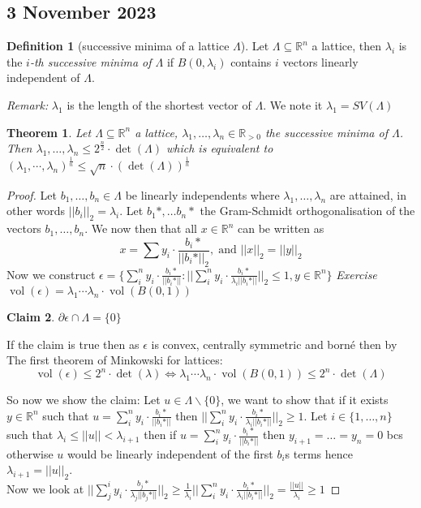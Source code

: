 \documentclass[a4paper,11pt,american]{article}
\newcommand{\R}{\mathbb{R}}
\DeclareMathOperator{\vol}{vol}
\theoremstyle{plain}
\newtheorem{theorem}{Theorem}
\newtheorem{claim}[theorem]{Claim}
\theoremstyle{definition}
\newtheorem{definition}{Definition}
\begin{document}
\subsection*{3 November 2023}

\begin{definition}[successive minima of a lattice $\Lambda$]
    Let $\Lambda\subseteq \R^n$ a lattice, then $\lambda_i$ is the \emph{$i$-th successive minima of $\Lambda
    $} if $B(0,\lambda_i)$ contains $i$ vectors linearly independent of $\Lambda$.
\end{definition}
\emph{Remark:} $\lambda_1$ is the length of the shortest vector of $\Lambda$. We note it $\lambda_1=SV(\Lambda)$
\begin{theorem}
    Let $\Lambda\subseteq \R^n$ a lattice, $\lambda_1,\dots,\lambda_n\in\R_{>0}$ the successive minima of $\Lambda$. Then $\lambda_1,\dots,\lambda_n\leq 2^\frac{n}{2}\cdot\det(\Lambda)$ which is equivalent to  $(\lambda_1,\cdots,\lambda_n)^{\frac{1}{n}}\leq \sqrt{n}\cdot(\det(\Lambda))^{\frac{1}{n}}$
\end{theorem}
\begin{proof}
    Let $b_1,\dots,b_n\in\Lambda$ be linearly independents where $\lambda_1,\dots,\lambda_n$ are attained, in other words $\vert\vert b_i\vert\vert_2=\lambda_i$.
    Let $b_1*,\dots b_n*$ the Gram-Schmidt orthogonalisation of the vectors $b_1,\dots,b_n$. We now then that all $x\in\R^n$ can be written as $$x=\sum y_i\cdot \frac{b_i*}{\vert\vert b_i*\vert\vert_2},\; \text{and } \vert\vert x\vert\vert_2=\vert\vert y\vert\vert_2$$
    Now we construct $\epsilon=\{\sum_i^n y_i\cdot \frac{b_i*}{\vert\vert b_i*\vert\vert}:\vert\vert\sum_i^n y_i\cdot \frac{b_i*}{\lambda_i\vert\vert b_i*\vert\vert}\vert\vert_2\leq 1, y\in\R^n\}$
    \emph{Exercise} $\vol(\epsilon)=\lambda_1\cdots\lambda_n\cdot\vol(B(0,1))$
    \begin{claim}
        $\partial\epsilon\cap\Lambda=\{0\}$
    \end{claim}
    If the claim is true then as $\epsilon$ is convex, centrally symmetric and borné then by The first theorem of Minkowski for lattices: $$\vol(\epsilon)\leq 2^n\cdot\det(\lambda)\iff \lambda_1\cdots\lambda_n\cdot\vol(B(0,1))\leq 2^n\cdot\det(\Lambda)$$

    So now we show the claim: Let $u\in\Lambda\backslash\{0\}$, we want to show that if it exists $y\in\R^n$ such that $u=\sum_i^n y_i\cdot \frac{b_i*}{\vert\vert b_i*\vert\vert}$ then $\vert\vert\sum_i^n y_i\cdot \frac{b_i*}{\lambda_i\vert\vert b_i*\vert\vert}\vert\vert_2\geq 1$.
    Let $i\in\{1,\dots,n\}$ such that $\lambda_i\leq \vert\vert u\vert\vert<\lambda_{i+1}$ then if $u=\sum_i^n y_i\cdot \frac{b_i*}{\vert\vert b_i*\vert\vert}$ then $y_{i+1}=\dots=y_n=0$ bcs otherwise $u$ would be linearly independent of the first $b_i$s terms hence $\lambda_{i+1}=\vert\vert u\vert\vert_2$.\\
    Now we look at $\vert\vert\sum_j^i y_i\cdot \frac{b_j*}{\lambda_j\vert\vert b_j*\vert\vert}\vert\vert_2\geq\frac{1}{\lambda_i}\vert\vert\sum_i^n y_i\cdot \frac{b_i*}{\lambda_i\vert\vert b_i*\vert\vert}\vert\vert_2=\frac{\vert\vert u\vert\vert}{\lambda_i}\geq 1$
\end{proof}




\end{document}
